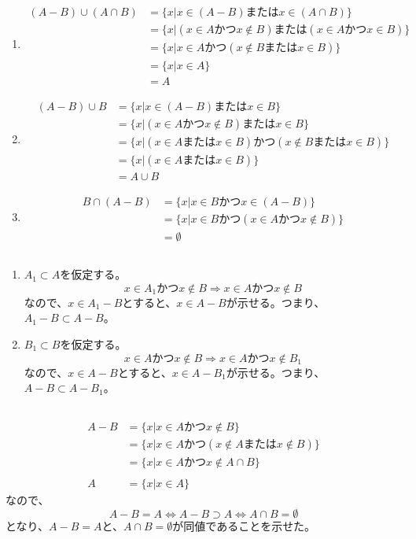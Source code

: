 \documentclass{jsarticle}
\begin{document}
\subsection{}
\begin{enumerate}
\item
\begin{align*}
(A-B)\cup(A\cap B)&=\{x|x\in(A-B) またはx\in(A\cap B)\}\\
&=\{x|(x\in A かつ x\notin B) または (x\in A かつ x\in B)\}\\
&=\{x|x\in A かつ (x\notin B または x\in B)\}\\
&=\{x|x\in A\}\\
&=A
\end{align*}


\item
\begin{align*}
(A-B)\cup B &=\{x| x\in (A-B) または x \in B\}\\
&=\{ x | (x \in A かつ x\notin B)　または x\in B \}\\
&=\{x | (x\in Aまたは x\in B) かつ( x\notin B または x\in B)\}\\
&=\{x| (x\in Aまたは x\in B)\}\\
&=A\cup B
\end{align*}


\item
\begin{align*}
B\cap(A-B)&=\{x|x\in B かつ x \in(A-B)\}\\
&=\{x|x\in B かつ( x \in A かつ x\notin B)\}\\
&=\emptyset
\end{align*}
\end{enumerate}

\subsection{}
\begin{enumerate}
\item
$A_1 \subset A$を仮定する。
\[x \in A_1 かつ x\notin B \Longrightarrow x\in A かつ x\notin B\]
なので、$x\in A_1-B$とすると、$x\in A-B$が示せる。つまり、$A_1-B \subset A-B$。
\item
$B_1 \subset B$を仮定する。
\[x \in A かつ x\notin B \Longrightarrow x\in A かつ x\notin B_1\]
なので、$x\in A-B$とすると、$x\in A-B_1$が示せる。つまり、$A-B \subset A-B_1$。
\end{enumerate}

\subsection{}
\begin{align*}
A-B&=\{x|x\in A かつ x\notin B\}\\
&=\{x|x\in A かつ (x\notin A または x\notin B)\}\\
&=\{x|x\in A かつ x\notin A\cap B\}\\\\
A&=\{x|x\in A\}
\end{align*}
なので、
\[A-B=A \Longleftrightarrow  A-B \supset A \Longleftrightarrow A\cap B = \emptyset\]
となり、$A-B=A$と、$A\cap B=\emptyset$が同値であることを示せた。
\end{document}
